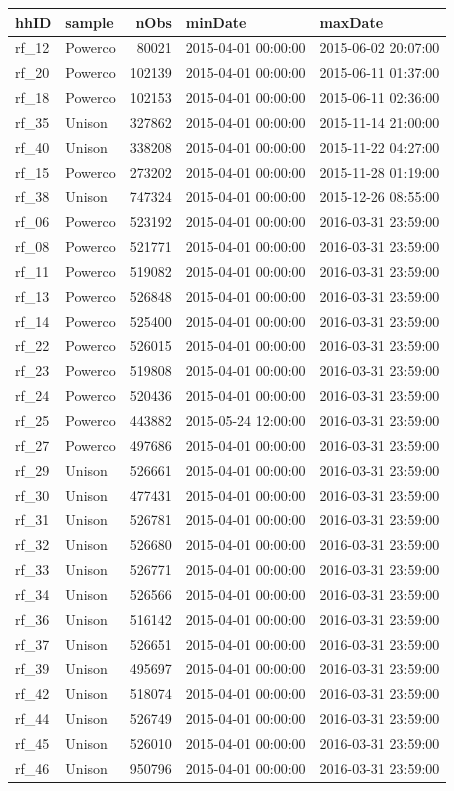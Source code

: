\documentclass[]{article}
\begin{document}
\begin{longtable}[]{@{}llrll@{}}
\toprule
hhID & sample & nObs & minDate & maxDate\tabularnewline
\midrule
\endhead
rf\_12 & Powerco & 80021 & 2015-04-01 00:00:00 & 2015-06-02
20:07:00\tabularnewline
rf\_20 & Powerco & 102139 & 2015-04-01 00:00:00 & 2015-06-11
01:37:00\tabularnewline
rf\_18 & Powerco & 102153 & 2015-04-01 00:00:00 & 2015-06-11
02:36:00\tabularnewline
rf\_35 & Unison & 327862 & 2015-04-01 00:00:00 & 2015-11-14
21:00:00\tabularnewline
rf\_40 & Unison & 338208 & 2015-04-01 00:00:00 & 2015-11-22
04:27:00\tabularnewline
rf\_15 & Powerco & 273202 & 2015-04-01 00:00:00 & 2015-11-28
01:19:00\tabularnewline
rf\_38 & Unison & 747324 & 2015-04-01 00:00:00 & 2015-12-26
08:55:00\tabularnewline
rf\_06 & Powerco & 523192 & 2015-04-01 00:00:00 & 2016-03-31
23:59:00\tabularnewline
rf\_08 & Powerco & 521771 & 2015-04-01 00:00:00 & 2016-03-31
23:59:00\tabularnewline
rf\_11 & Powerco & 519082 & 2015-04-01 00:00:00 & 2016-03-31
23:59:00\tabularnewline
rf\_13 & Powerco & 526848 & 2015-04-01 00:00:00 & 2016-03-31
23:59:00\tabularnewline
rf\_14 & Powerco & 525400 & 2015-04-01 00:00:00 & 2016-03-31
23:59:00\tabularnewline
rf\_22 & Powerco & 526015 & 2015-04-01 00:00:00 & 2016-03-31
23:59:00\tabularnewline
rf\_23 & Powerco & 519808 & 2015-04-01 00:00:00 & 2016-03-31
23:59:00\tabularnewline
rf\_24 & Powerco & 520436 & 2015-04-01 00:00:00 & 2016-03-31
23:59:00\tabularnewline
rf\_25 & Powerco & 443882 & 2015-05-24 12:00:00 & 2016-03-31
23:59:00\tabularnewline
rf\_27 & Powerco & 497686 & 2015-04-01 00:00:00 & 2016-03-31
23:59:00\tabularnewline
rf\_29 & Unison & 526661 & 2015-04-01 00:00:00 & 2016-03-31
23:59:00\tabularnewline
rf\_30 & Unison & 477431 & 2015-04-01 00:00:00 & 2016-03-31
23:59:00\tabularnewline
rf\_31 & Unison & 526781 & 2015-04-01 00:00:00 & 2016-03-31
23:59:00\tabularnewline
rf\_32 & Unison & 526680 & 2015-04-01 00:00:00 & 2016-03-31
23:59:00\tabularnewline
rf\_33 & Unison & 526771 & 2015-04-01 00:00:00 & 2016-03-31
23:59:00\tabularnewline
rf\_34 & Unison & 526566 & 2015-04-01 00:00:00 & 2016-03-31
23:59:00\tabularnewline
rf\_36 & Unison & 516142 & 2015-04-01 00:00:00 & 2016-03-31
23:59:00\tabularnewline
rf\_37 & Unison & 526651 & 2015-04-01 00:00:00 & 2016-03-31
23:59:00\tabularnewline
rf\_39 & Unison & 495697 & 2015-04-01 00:00:00 & 2016-03-31
23:59:00\tabularnewline
rf\_42 & Unison & 518074 & 2015-04-01 00:00:00 & 2016-03-31
23:59:00\tabularnewline
rf\_44 & Unison & 526749 & 2015-04-01 00:00:00 & 2016-03-31
23:59:00\tabularnewline
rf\_45 & Unison & 526010 & 2015-04-01 00:00:00 & 2016-03-31
23:59:00\tabularnewline
rf\_46 & Unison & 950796 & 2015-04-01 00:00:00 & 2016-03-31
23:59:00\tabularnewline
\bottomrule
\end{longtable}
\end{document}

